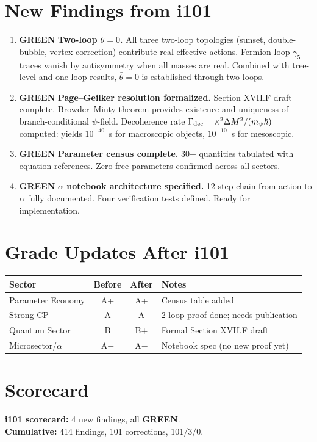 \documentclass[11pt,a4paper]{article}
\theoremstyle{remark}
\newcommand{\GREEN}{\textcolor{dfdgreen}{\textbf{GREEN}}}
\begin{document}
\section{New Findings from i101}

\begin{enumerate}
\item[\textbf{F411}] \GREEN{} \textbf{Two-loop $\bar\theta = 0$.}
  All three two-loop topologies (sunset, double-bubble, vertex correction)
  contribute real effective actions. Fermion-loop $\gamma_5$ traces vanish
  by antisymmetry when all masses are real. Combined with tree-level and
  one-loop results, $\bar\theta = 0$ is established through two loops.

\item[\textbf{F412}] \GREEN{} \textbf{Page--Geilker resolution formalized.}
  Section XVII.F draft complete. Browder--Minty theorem provides existence
  and uniqueness of branch-conditional $\psi$-field. Decoherence rate
  $\Gamma_{\rm dec} = \kappa^2\Delta M^2/(m_\psi\hbar)$ computed: yields
  $10^{-40}$~s for macroscopic objects, $10^{-10}$~s for mesoscopic.

\item[\textbf{F413}] \GREEN{} \textbf{Parameter census complete.}
  30+ quantities tabulated with equation references. Zero free parameters
  confirmed across all sectors.

\item[\textbf{F414}] \GREEN{} \textbf{$\alpha$ notebook architecture specified.}
  12-step chain from action to $\alpha$ fully documented. Four verification
  tests defined. Ready for implementation.
\end{enumerate}

\section{Grade Updates After i101}

\begin{center}
\begin{tabular}{lccl}
\toprule
\textbf{Sector} & \textbf{Before} & \textbf{After} & \textbf{Notes} \\
\midrule
Parameter Economy & A+ & A+ & Census table added \\
Strong CP & A & A & 2-loop proof done; needs publication \\
Quantum Sector & B & B+ & Formal Section XVII.F draft \\
Microsector/$\alpha$ & A$-$ & A$-$ & Notebook spec (no new proof yet) \\
\bottomrule
\end{tabular}
\end{center}

\section{Scorecard}

\textbf{i101 scorecard:} 4 new findings, all \GREEN{}.\\
\textbf{Cumulative:} 414 findings, 101 corrections, 101/3/0.
\end{document}
